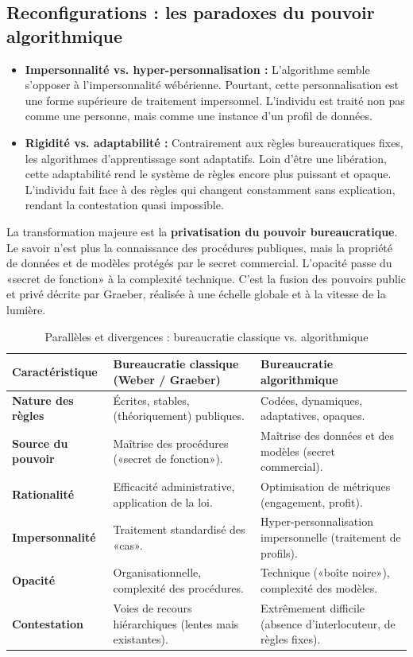 \subsection{Reconfigurations : les paradoxes du pouvoir algorithmique}
\begin{itemize}[label=\textbullet]
    \item \textbf{Impersonnalité vs. hyper-personnalisation :} L'algorithme semble s'opposer à l'impersonnalité wébérienne. Pourtant, cette personnalisation est une forme supérieure de traitement impersonnel. L'individu est traité non pas comme une personne, mais comme une instance d'un profil de données.
    \item \textbf{Rigidité vs. adaptabilité :} Contrairement aux règles bureaucratiques fixes, les algorithmes d'apprentissage sont adaptatifs. Loin d'être une libération, cette adaptabilité rend le système de règles encore plus puissant et opaque. L'individu fait face à des règles qui changent constamment sans explication, rendant la contestation quasi impossible.
\end{itemize}
La transformation majeure est la \textbf{privatisation du pouvoir bureaucratique}. Le savoir n'est plus la connaissance des procédures publiques, mais la propriété de données et de modèles protégés par le secret commercial. L'opacité passe du «secret de fonction» à la complexité technique. C'est la fusion des pouvoirs public et privé décrite par Graeber, réalisée à une échelle globale et à la vitesse de la lumière.

\begin{table}[ht]
\centering
\renewcommand{\tablename}{Tableau} 
\caption{Parallèles et divergences : bureaucratie classique vs. algorithmique}
\label{tab:bureau_comp}
\begin{tabular}{@{}p{}p{}p{}@{}}
\toprule
\textbf{Caractéristique} & \textbf{Bureaucratie classique (Weber / Graeber)} & \textbf{Bureaucratie algorithmique} \\ \midrule
\textbf{Nature des règles} & Écrites, stables, (théoriquement) publiques. & Codées, dynamiques, adaptatives, opaques. \\
\textbf{Source du pouvoir} & Maîtrise des procédures («secret de fonction»). & Maîtrise des données et des modèles (secret commercial). \\
\textbf{Rationalité} & Efficacité administrative, application de la loi. & Optimisation de métriques (engagement, profit). \\
\textbf{Impersonnalité} & Traitement standardisé des «cas». & Hyper-personnalisation impersonnelle (traitement de profils). \\
\textbf{Opacité} & Organisationnelle, complexité des procédures. & Technique («boîte noire»), complexité des modèles. \\
\textbf{Contestation} & Voies de recours hiérarchiques (lentes mais existantes). & Extrêmement difficile (absence d'interlocuteur, de règles fixes). \\ \bottomrule
\end{tabular}
\end{table}


